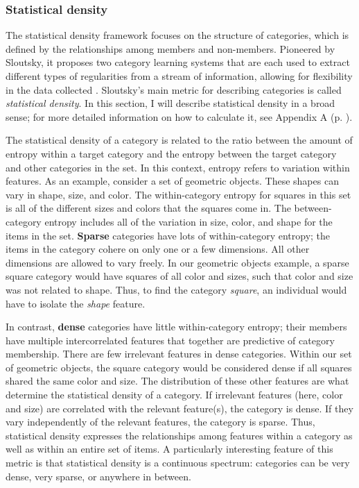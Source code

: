 \documentclass[../dissertation.tex]{subfiles}
\begin{document}
\subsubsection{Statistical density}

The statistical density framework focuses on the structure of categories, which is defined by the relationships among members and non-members. Pioneered by Sloutsky, it proposes two category learning systems that are each used to extract different types of regularities from a stream of information, allowing for flexibility in the data collected \citep{Sloutsky2010}. Sloutsky's main metric for describing categories is called \textit{statistical density}. In this section, I will describe statistical density in a broad sense; for more detailed information on how to calculate it, see Appendix A (p. \pageref{appendixA}). \par
	The statistical density of a category is related to the ratio between the amount of entropy within a target category and the entropy between the target category and other categories in the set. In this context, entropy refers to variation within features. As an example, consider a set of geometric objects. These shapes can vary in shape, size, and color. The within-category entropy for squares in this set is all of the different sizes and colors that the squares come in. The between-category entropy includes all of the variation in size, color, and shape for the items in the set. \textbf{Sparse} categories have lots of within-category entropy; the items in the category cohere on only one or a few dimensions. All other dimensions are allowed to vary freely. In our geometric objects example, a sparse square category would have squares of all color and sizes, such that color and size was not related to shape. Thus, to find the category \textit{square}, an individual would have to isolate the \textit{shape} feature. \par
	In contrast, \textbf{dense} categories have little within-category entropy; their members have multiple intercorrelated features that together are predictive of category membership. There are few irrelevant features in dense categories. Within our set of geometric objects, the square category would be considered dense if all squares shared the same color and size. The distribution of these other features are what determine the statistical density of a category. If irrelevant features (here, color and size) are correlated with the relevant feature(s), the category is dense. If they vary independently of the relevant features, the category is sparse. Thus, statistical density expresses the relationships among features within a category as well as within an entire set of items. A particularly interesting feature of this metric is that statistical density is a continuous spectrum: categories can be very dense, very sparse, or anywhere in between. \par 
\end{document}

